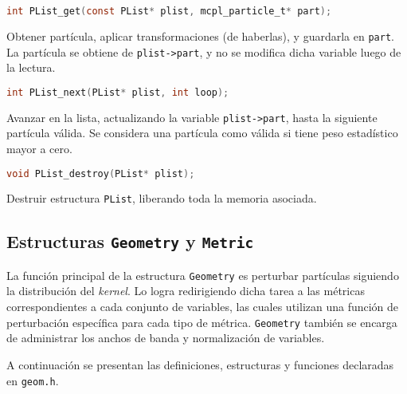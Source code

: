 \begin{footnotesize}
\begin{lstlisting}[language=C]
int PList_get(const PList* plist, mcpl_particle_t* part);
\end{lstlisting}
\begin{addmargin}[0.5cm]{0cm}
Obtener partícula, aplicar transformaciones (de haberlas), y guardarla en \verb|part|. La partícula se obtiene de \verb|plist->part|, y no se modifica dicha variable luego de la lectura.
\end{addmargin}

\begin{lstlisting}[language=C]
int PList_next(PList* plist, int loop);
\end{lstlisting}
\begin{addmargin}[0.5cm]{0cm}
Avanzar en la lista, actualizando la variable \verb|plist->part|, hasta la siguiente partícula válida. Se considera una partícula como válida si tiene peso estadístico mayor a cero.
\end{addmargin}

\begin{lstlisting}[language=C]
void PList_destroy(PList* plist);
\end{lstlisting}
\begin{addmargin}[0.5cm]{0cm}
Destruir estructura \verb|PList|, liberando toda la memoria asociada.
\end{addmargin}

\end{footnotesize}


\subsection{Estructuras \texttt{Geometry} y \texttt{Metric}}

La función principal de la estructura \verb|Geometry| es perturbar partículas siguiendo la distribución del \emph{kernel}. Lo logra redirigiendo dicha tarea a las métricas correspondientes a cada conjunto de variables, las cuales utilizan una función de perturbación específica para cada tipo de métrica. \verb|Geometry| también se encarga de administrar los anchos de banda y normalización de variables.

A continuación se presentan las definiciones, estructuras y funciones declaradas en \verb|geom.h|.

